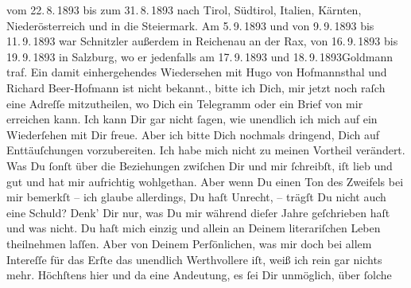 \begin{ledgroupsized}[t]{13cm}
{{{                  vom 22. 8. 1893 bis zum
                     31. 8. 1893 nach Tirol, Südtirol, Italien, Kärnten, Niederösterreich und in die Steiermark. Am 5. 9. 1893 und von 9. 9. 1893 bis 11. 9. 1893 war Schnitzler
                  außerdem in Reichenau an der Rax, von 16. 9. 1893 bis 19. 9. 1893 in Salzburg, wo er jedenfalls am 17. 9. 1893 und 18. 9. 1893Goldmann traf. Ein damit einhergehendes
                  Wiedersehen mit Hugo von Hofmannsthal und
                     Richard Beer-Hofmann ist nicht
                  bekannt.}}}\label{K_L02712-2h}, bitte ich Dich, mir jetzt noch raſch eine Adreſſe mitzutheilen,
               wo Dich ein Telegramm oder ein Brief von mir erreichen kann. Ich kann Dir gar nicht
               ſagen, wie unendlich ich mich auf ein Wiederſehen mit Dir freue. Aber ich bitte Dich
               nochmals dringend, Dich auf Enttäuſchungen vorzubereiten. Ich habe mich nicht zu
               meinen Vortheil verändert.\pend
           \pstart
           Was Du ſonſt über die Beziehungen zwiſchen Dir und mir ſchreibſt, iſt lieb und gut
               und hat mir aufrichtig wohlgethan. Aber wenn Du einen Ton des Zweifels bei {\pb}mir bemerkſt – ich glaube allerdings, Du haſt
               Unrecht, – trägſt Du nicht auch eine Schuld? Denk’ Dir nur, was Du mir während dieſer
               Jahre geſchrieben haſt und was nicht. Du haſt mich einzig und allein an Deinem
               literariſchen Leben theilnehmen laſſen. Aber von Deinem Perſönlichen, was mir doch
               bei allem Intereſſe für das Erſte das unendlich Werthvollere iſt, weiß ich rein gar
               nichts mehr. Höchſtens hier und da eine Andeutung, es ſei Dir unmöglich, über ſolche

\end{ledgroupsized}
